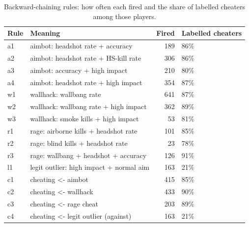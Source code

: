 \begin{table}
\caption{Backward-chaining rules: how often each fired and the share of labelled cheaters among those players.}
\label{tab:rules}
\begin{tabular}{llrl}
\toprule
Rule & Meaning & Fired & Labelled cheaters \\
\midrule
a1 & aimbot: headshot rate + accuracy & 189 & 86\% \\
a2 & aimbot: headshot rate + HS-kill rate & 306 & 86\% \\
a3 & aimbot: accuracy + high impact & 210 & 80\% \\
a4 & aimbot: headshot rate + high impact & 354 & 87\% \\
w1 & wallhack: wallbang rate & 641 & 87\% \\
w2 & wallhack: wallbang rate + high impact & 362 & 89\% \\
w3 & wallhack: smoke kills + high impact & 53 & 81\% \\
r1 & rage: airborne kills + headshot rate & 101 & 85\% \\
r2 & rage: blind kills + headshot rate & 23 & 78\% \\
r3 & rage: wallbang + headshot + accuracy & 126 & 91\% \\
l1 & legit outlier: high impact + normal aim & 163 & 21\% \\
c1 & cheating <- aimbot & 415 & 85\% \\
c2 & cheating <- wallhack & 433 & 90\% \\
c3 & cheating <- rage cheat & 203 & 89\% \\
c4 & cheating <- legit outlier (against) & 163 & 21\% \\
\bottomrule
\end{tabular}
\end{table}
